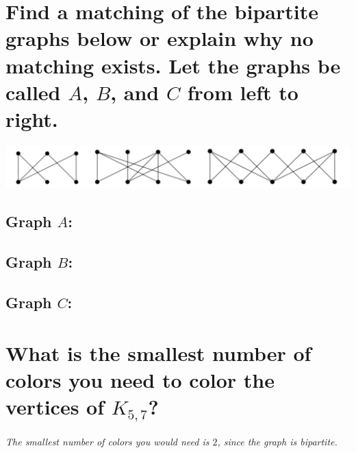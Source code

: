 \documentclass{article}
\begin{document}

\section{Find a matching of the bipartite graphs below or explain why no matching exists. Let the graphs be called $A$, $B$, and $C$ from left to right.}
\begin{center}
    \includegraphics[scale=0.33]{problem3.png}
\end{center}
\subsection{Graph $A$:}
\subsection{Graph $B$:}
\subsection{Graph $C$:}
\clearpage


\section{What is the smallest number of colors you need to color the vertices of $K_{5,7}$?}
\hspace{1cm}\textit{The smallest number of colors you would need is $2$, since the graph is bipartite.}

\end{document}
